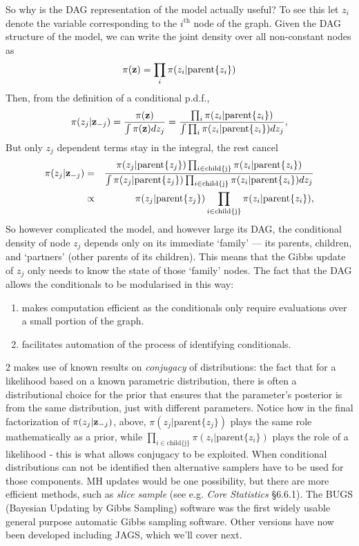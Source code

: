 \documentclass[10pt] {article}
\theoremstyle{definition}
\begin{document}
So why is the DAG representation of the model actually useful?  To see this let $z_i$ denote the variable corresponding to the $i^\text{th}$ node of the graph. Given the DAG structure of the model, we can write the joint density over all non-constant nodes as 
$$
\pi({\bf z}) = \prod_{i} \pi (z_i|\text{parent}\{z_i\})
$$
Then, from the definition of a conditional p.d.f.,
$$
\pi(z_j|{\bf z}_{-j}) = \frac{\pi({\bf z})}{\int \pi({\bf z}) d z_{j}} = \frac{\prod_{i} \pi(z_i|\text{parent}\{z_i\})}{
\int \prod_{i} \pi(z_i|\text{parent}\{z_i\}) dz_j},
$$ 
But only $z_j$ dependent terms stay in the integral, the rest cancel
\begin{eqnarray*}
\pi(z_j|{\bf z}_{-j}) &=&  \frac{\pi(z_j|\text{parent}\{z_j\})\prod_{i \in \text{child\{j\}}}\pi(z_i|\text{parent}\{z_i\})}
{\int \pi(z_j|\text{parent}\{z_j\})\prod_{i \in \text{child\{j\}}}\pi(z_i|\text{parent}\{z_i\}) dz_j}\\
&\propto & \pi(z_j|\text{parent}\{z_j\})\prod_{i \in \text{child\{j\}}}\pi(z_i|\text{parent}\{z_i\}),
\end{eqnarray*}
So however complicated the model, and however large its DAG, the conditional density of node $z_j$ depends only on its immediate `family' --- its parents, children, and `partners' (other parents of its children). This means that the Gibbs update of $z_j$ only needs to know the state of those `family' nodes. The fact that the DAG allows the conditionals to be modularised in this way:
\begin{enumerate}
\item  makes computation efficient as the conditionals only require evaluations over a small portion of the graph.  
\item facilitates automation of the process of identifying conditionals.  
\end{enumerate}
2 makes use of known results on {\em conjugacy} of distributions: the fact that for a likelihood based on a known parametric distribution, there is often a distributional choice for the prior that ensures that the parameter's posterior is from the same distribution, just with different parameters. Notice how in the final factorization of $\pi(z_j|{\bf z}_{-j})$, above, $\pi(z_j|\text{parent}\{z_j\})$ plays the same role mathematically as a prior, while $\prod_{i \in \text{child\{j\}}}\pi(z_i|\text{parent}\{z_i\})$ plays the role of a likelihood - this is what allows conjugacy to be exploited. When conditional distributions can not be identified then alternative samplers have to be used for those components. MH updates would be one possibility, but there are more efficient methods, such as {\em slice sample} (see e.g. {\em Core Statistics} \S 6.6.1). The BUGS (Bayesian Updating by Gibbs Sampling) software was the first widely usable general purpose automatic Gibbs sampling software. Other versions have now been developed including JAGS, which we'll cover next.   
\end{document}
